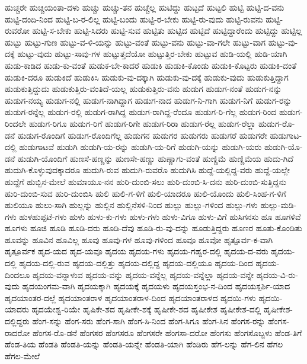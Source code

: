 {ಹುಚ್ಚರೇ
ಹುಚ್ಚಿಯಂತಾ-ದಳು
ಹುಚ್ಚು
ಹುಚ್ಚು-ತನ
ಹುಚ್ಚೆಲ್ಲ
ಹುಟಿದ್ದು
ಹುಟ್ಟದೆ
ಹುಟ್ಟಲಿ
ಹುಟ್ಟಿ
ಹುಟ್ಟಿ-ದ-ವನು
ಹುಟ್ಟಿ-ದಂದಿ-ನಿಂದ
ಹುಟ್ಟಿ-ಬ-ರ-ಲಿಲ್ಲ
ಹುಟ್ಟಿ-ಬಂದು
ಹುಟ್ಟಿ-ರ-ಬೇಕು
ಹುಟ್ಟಿ-ರು-ವುದು
ಹುಟ್ಟಿ-ರುವನು
ಹುಟ್ಟಿ-ರುವರೋ
ಹುಟ್ಟಿ-ಸ-ಬೇಕು
ಹುಟ್ಟಿ-ಸಿದರು
ಹುಟ್ಟಿ-ಸುವ
ಹುಟ್ಟಿತು
ಹುಟ್ಟಿದ
ಹುಟ್ಟಿದೆ
ಹುಟ್ಟಿದ್ದಾರೆಂದು
ಹುಟ್ಟಿದ್ದು
ಹುಟ್ಟಿಲ್ಲ
ಹುಟ್ಟು
ಹುಟ್ಟು-ಗುಣ
ಹುಟ್ಟು-ವ-ಳಿ-ಯನ್ನು
ಹುಟ್ಟು-ವಂತೆ
ಹುಟ್ಟು-ವನು
ಹುಟ್ಟು-ವಾ-ಗಲೇ
ಹುಟ್ಟು-ವಾಗ
ಹುಟ್ಟು-ವು-ದಕ್ಕೆ
ಹುಟ್ಟು-ವುದು
ಹುಟ್ಟು-ಸಾವು-ಗಳ
ಹುಟ್ಟುತ್ತದೆಯೋ
ಹುಟ್ಟುತ್ತಿರ-ಬೇಕು
ಹುಟ್ಟುವ
ಹುಡಿ-ಯಲ್ಲಿ
ಹುಡಿ-ಯಾಗಿ
ಹುಡು-ಕಾಡಿದ
ಹುಡು-ಕು-ವಂತೆ
ಹುಡುಕ-ಬೇ-ಕಾದರೆ
ಹುಡುಕಿ
ಹುಡುಕಿ-ಕೊಂಡು
ಹುಡುಕಿ-ಕೊಟ್ಟರು
ಹುಡುಕಿ-ದಂತೆ
ಹುಡುಕಿ-ದರೂ
ಹುಡುಕಿದೆ
ಹುಡುಕಿಸಿ
ಹುಡುಕು-ವು-ದಕ್ಕಾಗಿ
ಹುಡುಕು-ವು-ದಕ್ಕೆ
ಹುಡುಕು-ವುದು
ಹುಡುಕುತ್ತಿದ್ದಾಗ
ಹುಡುಕುತ್ತಿದ್ದುದು
ಹುಡುಕುತ್ತಿರು-ವಂತಿದೆ-ಯಲ್ಲ
ಹುಡುಕುತ್ತಿರು-ವನು
ಹುಡುಗ
ಹುಡುಗ-ನಂತೆ
ಹುಡುಗ-ನನ್ನು
ಹುಡುಗ-ನಯ್ಯ
ಹುಡುಗ-ನಲ್ಲಿ
ಹುಡುಗ-ನಾಗಿದ್ದಾಗ
ಹುಡುಗ-ನಾದ
ಹುಡುಗ-ನಿ-ಗಾಗಿ
ಹುಡುಗ-ನಿಗೆ
ಹುಡುಗ-ರನ್ನು
ಹುಡುಗ-ರನ್ನೆಲ್ಲ
ಹುಡುಗ-ರಲ್ಲಿ
ಹುಡುಗ-ರಾಗಿದ್ದ
ಹುಡುಗ-ರಾಗಿದ್ದ-ರೆಂದೂ
ಹುಡುಗ-ರಿ-ಗೆಲ್ಲ
ಹುಡುಗ-ರಿಂದ
ಹುಡುಗ-ರಿಂದಲೇ
ಹುಡುಗ-ರಿಗೂ
ಹುಡುಗ-ರಿಗೆ
ಹುಡುಗ-ರಿಗೇ
ಹುಡುಗ-ರಿರಾ
ಹುಡುಗ-ರೆಲ್ಲ
ಹುಡುಗ-ರೆಲ್ಲಾ
ಹುಡುಗ-ರೊ-ಡನೆ
ಹುಡುಗ-ರೊಂದಿಗೆ
ಹುಡುಗ-ರೊಂದಿಗೆಲ್ಲ
ಹುಡುಗನ
ಹುಡುಗರ
ಹುಡುಗರು
ಹುಡುಗರೆ
ಹುಡುಗರೇ
ಹುಡುಗಾಟ-ದಲ್ಲಿ
ಹುಡುಗಾಟವೆ
ಹುಡುಗಿ
ಹುಡುಗಿ-ಯ-ರನ್ನು
ಹುಡುಗಿ-ಯ-ರಿಗೆ
ಹುಡುಗಿ-ಯನ್ನು
ಹುಡುಗಿ-ಯರು
ಹುಡುಗಿ-ಯೊ-ಡನೆ
ಹುಡುಗಿ-ಯೊಂದಿಗೆ
ಹುಣಸೆ-ಹಣ್ಣನ್ನು
ಹುಣಸೇ-ಹಣ್ಣು
ಹುಣ್ಣಾಗು-ವಂತೆ
ಹುಣ್ಣಿಮೆ
ಹುಣ್ಣಿಮೆಯ
ಹುದು-ಗಿದೆ
ಹುದುಗಿ-ಕೊಳ್ಳುವುದಕ್ಕಾದರೂ
ಹುದುಗಿ-ರುವ
ಹುದುಗಿ-ರುವರೊ
ಹುದುಗಿಸಿ
ಹುದ್ದೆ-ಯಲ್ಲಿದ್ದ-ವರು
ಹುದ್ದೆ-ಯಲ್ಲೇ
ಹುದ್ದೆಗೆ
ಹುಬ್ಬಿನ-ಮೇಲೆ
ಹುಮಾಯೂ-ನನ
ಹುರಿ-ದುಂಬಿ-ಸಲು
ಹುರಿ-ದುಂಬಿ-ಸಿ-ದನು
ಹುರಿ-ದುಂಬಿ-ಸುತ್ತಿದ್ದನು
ಹುರಿ-ದುಂಬಿ-ಸುವ
ಹುರಿ-ದುಂಬಿಸಿ
ಹುಲಿ
ಹುಲಿ-ಗ-ಳಿಗೆ
ಹುಲಿ-ಯಾದರೂ
ಹುಲಿ-ಯೊಂದು
ಹುಲಿ-ಸಿಂಹ-ಗ-ಳಿಗೆ
ಹುಲಿಯೂ
ಹುಲು-ಸಾಗಿ
ಹುಲ್ಲನ್ನು
ಹುಲ್ಲಿನ
ಹುಲ್ಲಿನೆಸಳಿ-ನಿಂದ
ಹುಲ್ಲು
ಹುಲ್ಲು-ಗಳಿಂದ
ಹುಲ್ಲು-ಗಳು
ಹುಲ್ಲು-ಮಡಿ-ಗಳು
ಹುಳಹುಪ್ಪಟೆ-ಗಳು
ಹುಳು
ಹುಳು-ಕು-ಗಳು
ಹುಳು-ಗಳು
ಹುಳು-ವಿಗೂ
ಹುಳು-ವಿಗೆ
ಹುಸಿಗನಸು
ಹೂ
ಹೂಗಳಿವೆ
ಹೂಗಳು
ಹೂಜಿ
ಹೂಡಿ
ಹೂಡಿ-ದರು
ಹೂಡಿ-ದೆವು
ಹೂಡಿ-ರು-ವು-ದನ್ನು
ಹೂಡುತ್ತಿದ್ದರು
ಹೂಣರ
ಹೂತು-ಕೊಂಡಿತು
ಹೂವನ್ನು
ಹೂವಿನ
ಹೂವಿಲ್ಲ
ಹೂವು
ಹೂವು-ಗಳ
ಹೂವು-ಗಳಿಂದ
ಹೂವೂ
ಹೂವೋ
ಹೃತ್ಪೂರ್ವ-ಕ-ವಾಗಿ
ಹೃತ್ಪೂರ್ವಕ
ಹೃದ-ಯದ
ಹೃದ-ಯವೂ
ಹೃದಯ
ಹೃದಯ-ಗಳು
ಹೃದಯ-ಗಹ್ವರ-ದಲ್ಲಿ
ಹೃದಯ-ದ-ವರು
ಹೃದಯ-ದಲ್ಲಿ
ಹೃದಯ-ದಲ್ಲಿ-ರುವ
ಹೃದಯ-ದಲ್ಲಿತ್ತು
ಹೃದಯ-ದಲ್ಲಿದ್ದ
ಹೃದಯ-ದಲ್ಲಿಯೂ
ಹೃದಯ-ದಿಂದ
ಹೃದಯ-ದಿಂದಲೂ
ಹೃದಯ-ವನ್ನಾಳುವ
ಹೃದಯ-ವನ್ನು
ಹೃದಯ-ವನ್ನೆಲ್ಲ
ಹೃದಯ-ವನ್ನೆಲ್ಲಾ
ಹೃದಯ-ವನ್ನೇ
ಹೃದಯ-ವಿ-ರು-ವುದು
ಹೃದಯಂಗಮ-ವಾಗಿ
ಹೃದಯಕ್ಕಾಗಿ
ಹೃದಯಕ್ಕೆ
ಹೃದಯಳು
ಹೃದಯಸ್ತಂಭ-ನ-ದಿಂದ
ಹೃದಯಸ್ಪರ್ಶಿ-ಯಾದ
ಹೃದಯಾಂತರ-ದಲ್ಲೆ
ಹೃದಯಾಂತರಾಳ
ಹೃದಯಾಂತರಾಳ-ದಿಂದ
ಹೃದಯಾಂತರಾಳದ
ಹೃದಯಿ-ಗಳು
ಹೃದಯಿ-ಯಾದರು
ಹೃದಯೇಶ್ವ-ರಿಯೇ
ಹೃಷಿಕೇ-ಶದ
ಹೃಷೀಕೇ-ಶಕ್ಕೆ
ಹೃಷೀಕೇ-ಶದ
ಹೃಷೀಕೇಶ
ಹೃಷೀಕೇಶ-ದಲ್ಲಿ
ಹೃಷೀಕೇಶ-ದಲ್ಲಿದ್ದರು
ಹೆಂಗ-ಸನ್ನು
ಹೆಂಗ-ಸರು
ಹೆಂಗ-ಸಾಗಿ
ಹೆಂಗ-ಸಿ-ನಿಂದ
ಹೆಂಗ-ಸಿಗೂ
ಹೆಂಗ-ಸಿನ
ಹೆಂಗಸ-ರನ್ನು
ಹೆಂಗಸ-ರಾದರೋ
ಹೆಂಗಸ-ರೊ-ಡನೆ
ಹೆಂಗಸರ
ಹೆಂಗಸರೂ
ಹೆಂಗಸರೇ
ಹೆಂಗಸಾ-ದರೋ
ಹೆಂಗಸು
ಹೆಂಗಸೊಬ್ಬಳು
ಹೆಂಡ-ತಿಗೆ
ಹೆಂಡ-ತಿಯ
ಹೆಂಡತಿ
ಹೆಂಡತಿ-ಯನ್ನು
ಹೆಂಡತಿ-ಯನ್ನೇ
ಹೆಂಡತಿ-ಯಾಗಿ
ಹೆಂಡಿರು
ಹೆಗ-ಲನ್ನು
ಹೆಗ-ಲಿನ
ಹೆಗಲ
ಹೆಗಲ-ಮೇಲೆ
}
